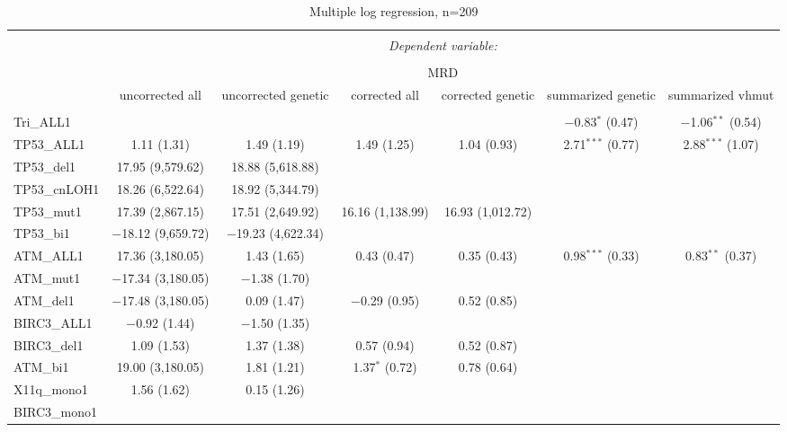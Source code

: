 \documentclass[a4paper,11pt]{article}
\begin{document}
\begin{table}[!htbp] \centering 
  \caption{Multiple log regression, n=209} 
  \label{} 
\tiny 
\begin{tabular}{@{\extracolsep{5pt}}lcccccc} 
\\[-1.8ex]\hline 
\hline \\[-1.8ex] 
 & \multicolumn{6}{c}{\textit{Dependent variable:}} \\ 
\cline{2-7} 
\\[-1.8ex] & \multicolumn{6}{c}{MRD} \\ 
 & uncorrected
all & uncorrected
genetic & corrected
all & corrected
genetic & summarized
genetic & summarized
vhmut \\ 
\hline \\[-1.8ex] 
 Tri\_ALL1 &  &  &  &  & $-$0.83$^{*}$ (0.47) & $-$1.06$^{**}$ (0.54) \\ 
  TP53\_ALL1 & 1.11 (1.31) & 1.49 (1.19) & 1.49 (1.25) & 1.04 (0.93) & 2.71$^{***}$ (0.77) & 2.88$^{***}$ (1.07) \\ 
  TP53\_del1 & 17.95 (9,579.62) & 18.88 (5,618.88) &  &  &  &  \\ 
  TP53\_cnLOH1 & 18.26 (6,522.64) & 18.92 (5,344.79) &  &  &  &  \\ 
  TP53\_mut1 & 17.39 (2,867.15) & 17.51 (2,649.92) & 16.16 (1,138.99) & 16.93 (1,012.72) &  &  \\ 
  TP53\_bi1 & $-$18.12 (9,659.72) & $-$19.23 (4,622.34) &  &  &  &  \\ 
  ATM\_ALL1 & 17.36 (3,180.05) & 1.43 (1.65) & 0.43 (0.47) & 0.35 (0.43) & 0.98$^{***}$ (0.33) & 0.83$^{**}$ (0.37) \\ 
  ATM\_mut1 & $-$17.34 (3,180.05) & $-$1.38 (1.70) &  &  &  &  \\ 
  ATM\_del1 & $-$17.48 (3,180.05) & 0.09 (1.47) & $-$0.29 (0.95) & 0.52 (0.85) &  &  \\ 
  BIRC3\_ALL1 & $-$0.92 (1.44) & $-$1.50 (1.35) &  &  &  &  \\ 
  BIRC3\_del1 & 1.09 (1.53) & 1.37 (1.38) & 0.57 (0.94) & 0.52 (0.87) &  &  \\ 
  ATM\_bi1 & 19.00 (3,180.05) & 1.81 (1.21) & 1.37$^{*}$ (0.72) & 0.78 (0.64) &  &  \\ 
  X11q\_mono1 & 1.56 (1.62) & 0.15 (1.26) &  &  &  &  \\ 
  BIRC3\_mono1 &  &  &  &  &  &  \\ 

\end{tabular}
\end{table}
\end{document}
